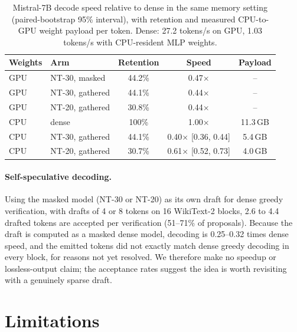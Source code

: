 \documentclass[10pt,twocolumn,letterpaper]{article}
\begin{document}
\begin{table}[t]
\centering
\caption{Mistral-7B decode speed relative to dense in the same memory setting (paired-bootstrap 95\% interval), with retention and measured CPU-to-GPU weight payload per token. Dense: 27.2 tokens/s on GPU, 1.03 tokens/s with CPU-resident MLP weights.}
\label{tab:latency}
\small
\setlength{\tabcolsep}{3pt}
\begin{tabular}{@{}llccc@{}}
\toprule
Weights & Arm & Retention & Speed & Payload \\
\midrule
GPU & NT-30, masked & 44.2\% & 0.47$\times$ & -- \\
GPU & NT-30, gathered & 44.1\% & 0.44$\times$ & -- \\
GPU & NT-20, gathered & 30.8\% & 0.44$\times$ & -- \\
\addlinespace
CPU & dense & 100\% & 1.00$\times$ & 11.3\,GB \\
CPU & NT-30, gathered & 44.1\% & 0.40$\times$ {\footnotesize [0.36, 0.44]} & 5.4\,GB \\
CPU & NT-20, gathered & 30.7\% & 0.61$\times$ {\footnotesize [0.52, 0.73]} & 4.0\,GB \\
\bottomrule
\end{tabular}
\end{table}

\paragraph{Self-speculative decoding.} Using the masked model (NT-30 or NT-20) as its own draft for dense greedy verification, with drafts of 4 or 8 tokens on 16 WikiText-2 blocks, 2.6 to 4.4 drafted tokens are accepted per verification (51--71\% of proposals). Because the draft is computed as a masked dense model, decoding is 0.25--0.32 times dense speed, and the emitted tokens did not exactly match dense greedy decoding in every block, for reasons not yet resolved. We therefore make no speedup or lossless-output claim; the acceptance rates suggest the idea is worth revisiting with a genuinely sparse draft.

\section{Limitations}\label{sec:limits}
\end{document}
